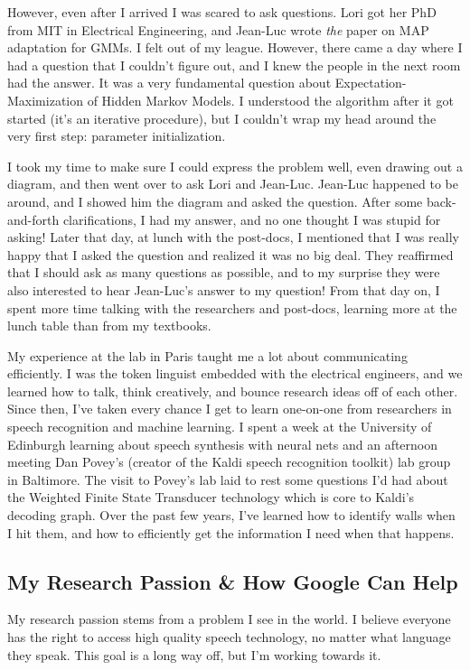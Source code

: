 \documentclass[12pt,a4paper]{article}
\begin{document}
However, even after I arrived I was scared to ask questions. Lori got her PhD from MIT in Electrical Engineering, and Jean-Luc wrote \textit{the} paper on MAP adaptation for GMMs. I felt out of my league. However, there came a day where I had a question that I couldn't figure out, and I knew the people in the next room had the answer. It was a very fundamental question about Expectation-Maximization of Hidden Markov Models. I understood the algorithm after it got started (it's an iterative procedure), but I couldn't wrap my head around the very first step: parameter initialization.

I took my time to make sure I could express the problem well, even drawing out a diagram, and then went over to ask Lori and Jean-Luc. Jean-Luc happened to be around, and I showed him the diagram and asked the question. After some back-and-forth clarifications, I had my answer, and no one thought I was stupid for asking! Later that day, at lunch with the post-docs, I mentioned that I was really happy that I asked the question and realized it was no big deal. They reaffirmed that I should ask as many questions as possible, and to my surprise they were also interested to hear Jean-Luc's answer to my question! From that day on, I spent more time talking with the researchers and post-docs, learning more at the lunch table than from my textbooks.

My experience at the lab in Paris taught me a lot about communicating efficiently. I was the token linguist embedded with the electrical engineers, and we learned how to talk, think creatively, and bounce research ideas off of each other. Since then, I've taken every chance I get to learn one-on-one from researchers in speech recognition and machine learning. I spent a week at the University of Edinburgh learning about speech synthesis with neural nets and an afternoon meeting Dan Povey's (creator of the Kaldi speech recognition toolkit) lab group in Baltimore. The visit to Povey's lab laid to rest some questions I'd had about the Weighted Finite State Transducer technology which is core to Kaldi's decoding graph. Over the past few years, I've learned how to identify walls when I hit them, and how to efficiently get the information I need when that happens.


\subsection*{My Research Passion \& How Google Can Help}

My research passion stems from a problem I see in the world. I believe everyone has the right to access high quality speech technology, no matter what language they speak. This goal is a long way off, but I'm working towards it.
\end{document}

